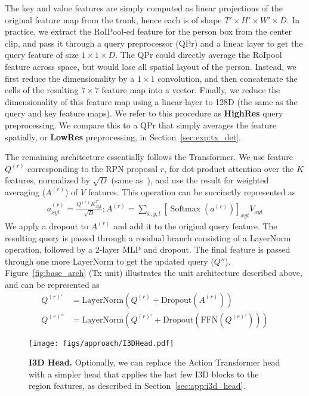 \documentclass[10pt,twocolumn,letterpaper]{article}
\newcommand{\Tx}[0]{Action Transformer}
\newcommand{\QPr}[0]{QPr}
\newcommand{\qprconcat}[0]{HighRes}
\newcommand{\qpravg}[0]{LowRes}
\DeclareMathOperator*{\Softmax}{Softmax}
\begin{document}
The key
and value features are simply computed as linear projections  of the
original feature map from the trunk, hence each is of shape $T'\times
H'\times W' \times D$.
In practice, we extract
the RoIPool-ed feature for the person box from the center clip, 
and
pass it through a query preprocessor (\QPr{}) 
and a linear layer 
to get
the query feature of size $1\times 1\times D$.  The \QPr{} could directly
average the RoIpool feature across space,
but would lose all spatial layout of the person.  Instead,
we first reduce the
dimensionality by a $1\times 1$ convolution, and then concatenate the cells of the resulting
$7\times 7$ feature map into a vector.  Finally, we reduce the
dimensionality of this feature map using a linear layer to 128D 
(the same as the query and key feature maps).
We refer to this procedure as {\bf
\qprconcat{}} query preprocessing.  We compare this to a \QPr{} that simply averages the
feature spatially, or {\bf \qpravg{}} preprocessing, in Section~\ref{sec:exp:tx_det}.



The remaining architecture essentially follows the Transformer. We use feature $Q^{(r)}$ corresponding to the RPN proposal $r$, for dot-product attention over the $K$ features, normalized by $\sqrt{D}$ (same as~\cite{vaswani2017attention}), and use the result for weighted averaging ($A^{(r)}$) of $V$ features. This operation can be succinctly represented as
\begin{align*}
a_{xyt}^{(r)} = \frac{Q^{(r)}K_{xyt}^T}{\sqrt{D}};
A^{(r)} = \sum_{x,y,t} \left[ \Softmax \left( a^{(r)} \right) \right]_{xyt} V_{xyt}
\end{align*}
We apply a dropout to $A^{(r)}$ and add it to the original query feature. The resulting query is 
passed through a residual branch consisting of a LayerNorm~\cite{ba2016layer} operation, followed by a 2-layer MLP and dropout.
The final feature is passed through one more LayerNorm to get the updated query ($Q''$).
Figure~\ref{fig:base_arch} (Tx unit) illustrates the unit architecture described above, and can be represented as
\begin{align*}
Q^{(r)'} &= \mathrm{LayerNorm} \left( Q^{(r)} + \mathrm{Dropout}\left( A^{(r)} \right) \right) \\
Q^{(r)''} &= \mathrm{LayerNorm} \left( Q^{(r)'} + \mathrm{Dropout} \left( \mathrm{FFN} \left( Q^{(r)'}\right) \right) \right)
\end{align*}

\begin{figure}[t]
\centering
\texttt{[image: figs/approach/I3DHead.pdf]}
\caption{
{\bf I3D Head.}
Optionally, we can replace the \Tx{} head with a simpler head that applies the last few I3D blocks to the region features,
as described in Section~\ref{sec:app:i3d_head}.
}\label{fig:i3d_head_arch}
\end{figure}
\end{document}
